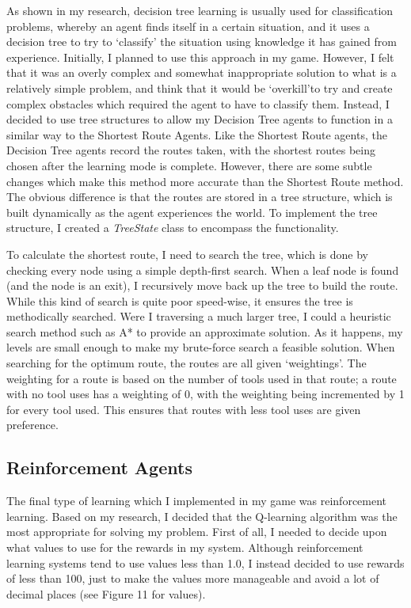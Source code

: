\documentclass[a4paper,oneside]{report}
\begin{document}
As shown in my research, decision tree learning is usually used for classification problems, whereby an agent finds itself in a certain situation, and it uses a decision tree to try to `classify' the situation using knowledge it has gained from experience. Initially, I planned to use this approach in my game. However, I felt that it was an overly complex and somewhat inappropriate solution to what is a relatively simple problem, and think that it would be `overkill'to try and create complex obstacles which required the agent to have to classify them. Instead, I decided to use tree structures to allow my Decision Tree agents to function in a similar way to the Shortest Route Agents. Like the Shortest Route agents, the Decision Tree agents record the routes taken, with the shortest routes being chosen after the learning mode is complete. However, there are some subtle changes which make this method more accurate than the Shortest Route method. The obvious difference is that the routes are stored in a tree structure, which is built dynamically as the agent experiences the world. To implement the tree structure, I created a \emph{TreeState} class to encompass the functionality.

To calculate the shortest route, I need to search the tree, which is done by checking every node using a simple depth-first search. When a leaf node is found (and the node is an exit), I recursively move back up the tree to build the route. While this kind of search is quite poor speed-wise, it ensures the tree is methodically searched. Were I traversing a much larger tree, I could a heuristic search method such as A* to provide an approximate solution. As it happens, my levels are small enough to make my brute-force search a feasible solution. When searching for the optimum route, the routes are all given `weightings'. The weighting for a route is based on the number of tools used in that route; a route with no tool uses has a weighting of 0, with the weighting being incremented by 1 for every tool used. This ensures that routes with less tool uses are given preference.

\subsection{Reinforcement Agents}

The final type of learning which I implemented in my game was reinforcement learning. Based on my research, I decided that the Q-learning algorithm was the most appropriate for solving my problem. First of all, I needed to decide upon what values to use for the rewards in my system. Although reinforcement learning systems tend to use values less than 1.0, I instead decided to use rewards of less than 100, just to make the values more manageable and avoid a lot of decimal places (see Figure 11 for values).
\end{document}
